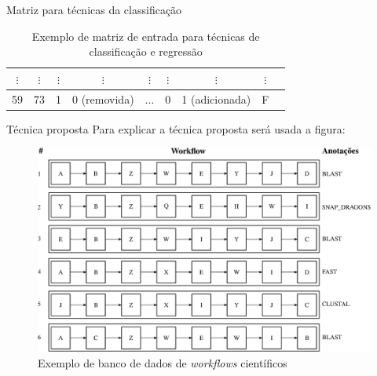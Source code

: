 \begin{frame}
\begin{block}{Matriz para técnicas da classificação}
\begin{table}[!htb]
\begin{tabular}{|c|c|c|c|c|c|c|c|c|}
				\(\vdots\)  &		\(\vdots\) 	   & \(\vdots\)   & \(\vdots\) 	  & \(\vdots\) 	  & \(\vdots\) & \(\vdots\) & \(\vdots\)	\\ \hline
				59	&		73 					   & 1 			  & 0 (removida)  & \(\ldots\) 	  & 0 & 1 (adicionada) & F	\\ \hline
			\end{tabular}
			\caption{Exemplo de matriz de entrada para técnicas de classificação e regressão}			
			\label{tabela_matriz_de_dados_adapatada_classificacao_regressao}
		\end{table}
	\end{block}
\end{frame}



\begin{frame}		
	\begin{block}{Técnica proposta}
		Para explicar a técnica proposta será usada a figura:
			\begin{figure}
				\begin{minipage}[b]{0.7\textwidth}
					\includegraphics[width=\textwidth]{./secoes/SolucaoProposta/recomendacaofreqontologia.eps}
					\caption{Exemplo de banco de dados de \emph{workflows} científicos}
				\end{minipage}
			\end{figure}
	\end{block}
\end{frame}


